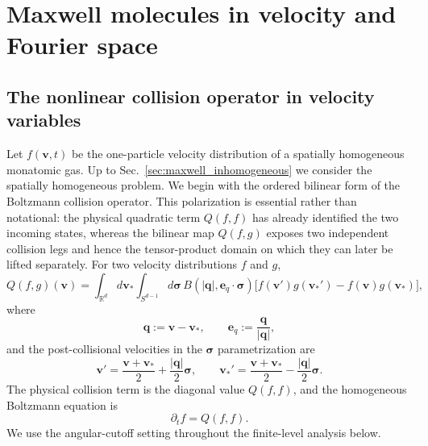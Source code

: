 \documentclass[11pt,oneside]{article}
\numberwithin{equation}{section}
\theoremstyle{definition}
\begin{document}
\section{Maxwell molecules in velocity and Fourier space}
\label{sec:maxwell_velocity_fourier}

\subsection{The nonlinear collision operator in velocity variables}
\label{subsec:maxwell_velocity_model}

Let $f(\bm v,t)$ be the one-particle velocity distribution of a spatially homogeneous monatomic gas.  Up to Sec.~\ref{sec:maxwell_inhomogeneous} we consider the spatially homogeneous problem.  We begin with the ordered bilinear form of the Boltzmann collision operator.  This polarization is essential rather than notational: the physical quadratic term $Q(f,f)$ has already identified the two incoming states, whereas the bilinear map $Q(f,g)$ exposes two independent collision legs and hence the tensor-product domain on which they can later be lifted separately.  For two velocity distributions $f$ and $g$,
\begin{equation}
Q(f,g)(\bm v)
=
\int_{\mathbb R^d}\!d\bm v_*
\int_{S^{d-1}}\!d\bm\sigma\,
B(|\bm q|,{\bm e}_q\!\cdot\!\bm\sigma)
\Big[
 f(\bm v')g(\bm v_*')-f(\bm v)g(\bm v_*)
\Big],
\label{eq:maxwell_velocity_bilinear_Q}
\end{equation}
where
\begin{equation}
\bm q:=\bm v-\bm v_*,
\qquad
{\bm e}_q:=\frac{\bm q}{|\bm q|},
\end{equation}
and the post-collisional velocities in the $\bm\sigma$ parametrization are
\begin{equation}
\bm v'
=\frac{\bm v+\bm v_*}{2}+\frac{|\bm q|}{2}\bm\sigma,
\qquad
\bm v_*'
=\frac{\bm v+\bm v_*}{2}-\frac{|\bm q|}{2}\bm\sigma.
\label{eq:maxwell_postcollisional_sigma}
\end{equation}
The physical collision term is the diagonal value $Q(f,f)$, and the homogeneous Boltzmann equation is
\begin{equation}
\partial_t f=Q(f,f).
\label{eq:maxwell_homogeneous_velocity_equation}
\end{equation}
We use the angular-cutoff setting throughout the finite-level analysis below.
\end{document}
